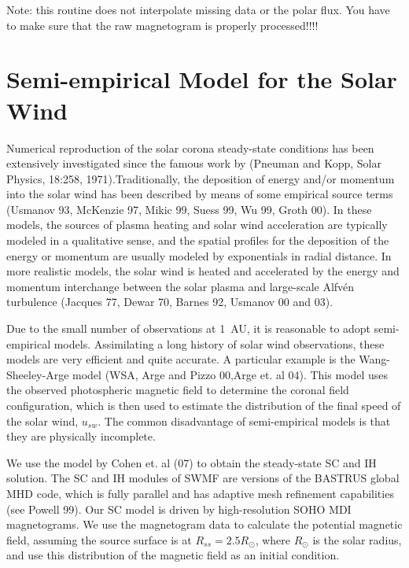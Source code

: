 \begin{bf}\begin{Large}Note: this routine does not interpolate missing data 
or the polar flux. You have to make sure that the raw magnetogram is properly 
processed!!!!\end{Large}\end{bf}



\section{Semi-empirical Model for the Solar Wind \label{section:semiempirical}}

Numerical reproduction of the solar corona steady-state conditions has been 
extensively 
investigated since the famous work by (Pneuman and Kopp, Solar Physics, 18:258, 
1971).Traditionally, the deposition of energy and/or momentum into the solar 
wind has been described by means of some empirical source terms (Usmanov 93, 
McKenzie 97, Mikic 99, Suess 99, Wu 99, Groth 00). In these models, 
the sources of plasma heating and solar wind acceleration are typically 
modeled in a qualitative sense, and the spatial profiles for the deposition 
of the energy or momentum are usually modeled by exponentials in radial 
distance. In more realistic models, the solar wind is heated and accelerated 
by the energy and momentum interchange between the solar plasma and 
large-scale Alfv\'en turbulence (Jacques 77, Dewar 70, Barnes 92, 
Usmanov 00 and 03).
 
Due to the small number of observations at 1~AU, it is reasonable to adopt 
semi-empirical models. Assimilating a long history of solar wind observations, 
these models are very efficient and quite accurate. A particular example is 
the Wang-Sheeley-Arge model (WSA, Arge and Pizzo 00,Arge et. al 04). 
This model uses the observed photospheric magnetic field to determine the 
coronal field configuration, which is then used to estimate the distribution 
of the final speed of the solar wind, $u_{sw}$. The common disadvantage of 
semi-empirical models is that they are physically incomplete. 

We use the model by Cohen et. al (07) to obtain the steady-state SC and IH 
solution. The SC and IH modules of SWMF are versions of the BASTRUS global 
MHD code, which is fully parallel and has adaptive mesh refinement 
capabilities (see Powell 99). Our SC model is driven by high-resolution 
SOHO MDI magnetograms. We use the magnetogram data to calculate the potential 
magnetic field, assuming the source surface is at $R_{ss}=2.5R_\odot$, where 
$R_\odot$ is the solar radius, and use this distribution of the magnetic field 
as an initial condition. 

